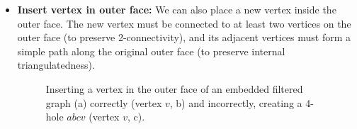 \begin{itemize}
	\clearpage
	\item \textbf{Insert vertex in outer face:} We can also place a new vertex inside the outer face. The new vertex must be connected to at least two vertices on the outer face (to preserve 2-connectivity), and its adjacent vertices must form a simple path along the original outer face (to preserve internal triangulatedness).
\begin{figure}[H]
	\centering
	\quad
	\quad
	\caption{Inserting a vertex in the outer face of an embedded filtered graph (a) correctly (vertex $v$, b) and incorrectly, creating a 4-hole $abcv$ (vertex $v$, c).}
	\label{fig:transformation}
\end{figure}


\end{itemize}
